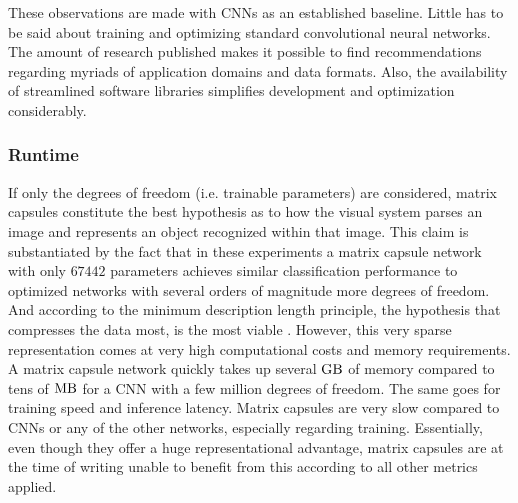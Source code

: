 \noindent
These observations are made with CNNs as an established baseline. Little has to be said about training and optimizing standard convolutional neural networks. The amount of research published makes it possible to find recommendations regarding myriads of application domains and data formats. Also, the availability of streamlined software libraries simplifies development and optimization considerably.
\subsubsection{Runtime}
If only the degrees of freedom (i.e. trainable parameters) are considered, matrix capsules constitute the best hypothesis as to how the visual system parses an image and represents an object recognized within that image. This claim is substantiated by the fact that in these experiments a matrix capsule network with only $\num{67442}$ parameters achieves similar classification performance to optimized networks with several orders of magnitude more degrees of freedom. And according to the minimum description length principle, the hypothesis that compresses the data most, is the most viable \cite{ rissanen1978modeling}. However, this very sparse representation comes at very high computational costs and memory requirements. A matrix capsule network quickly takes up several $\si{\giga\byte}$ of memory compared to tens of $\si{\mega\byte}$ for a CNN with a few million degrees of freedom. The same goes for training speed and inference latency. Matrix capsules are very slow compared to CNNs or any of the other networks, especially regarding training. Essentially, even though they offer a huge representational advantage, matrix capsules are at the time of writing unable to benefit from this according to all other metrics applied.

